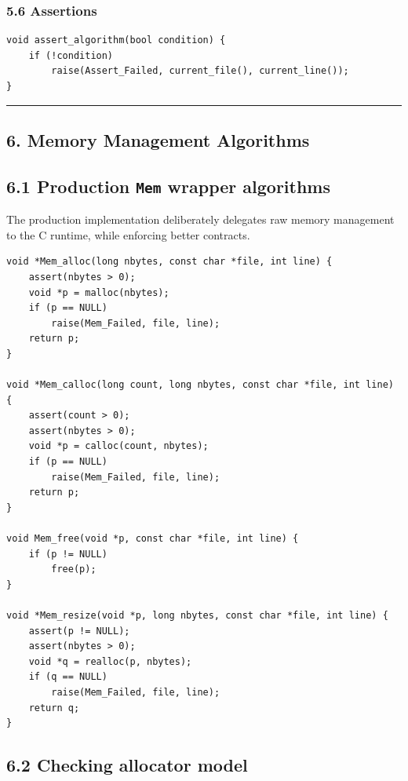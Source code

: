 \documentclass[11pt]{article}
\begin{document}
\subsubsection{5.6 Assertions}\label{assertions}

\begin{verbatim}
void assert_algorithm(bool condition) {
    if (!condition)
        raise(Assert_Failed, current_file(), current_line());
}
\end{verbatim}

\begin{center}\rule{0.5\linewidth}{0.5pt}\end{center}

\subsection{6. Memory Management Algorithms}\label{memory-management-algorithms}

\subsection{\texorpdfstring{6.1 Production \texttt{Mem} wrapper algorithms}{6.1 Production Mem wrapper algorithms}}\label{production-mem-wrapper-algorithms}

The production implementation deliberately delegates raw memory management to the C runtime, while enforcing better contracts.

\begin{verbatim}
void *Mem_alloc(long nbytes, const char *file, int line) {
    assert(nbytes > 0);
    void *p = malloc(nbytes);
    if (p == NULL)
        raise(Mem_Failed, file, line);
    return p;
}

void *Mem_calloc(long count, long nbytes, const char *file, int line) {
    assert(count > 0);
    assert(nbytes > 0);
    void *p = calloc(count, nbytes);
    if (p == NULL)
        raise(Mem_Failed, file, line);
    return p;
}

void Mem_free(void *p, const char *file, int line) {
    if (p != NULL)
        free(p);
}

void *Mem_resize(void *p, long nbytes, const char *file, int line) {
    assert(p != NULL);
    assert(nbytes > 0);
    void *q = realloc(p, nbytes);
    if (q == NULL)
        raise(Mem_Failed, file, line);
    return q;
}
\end{verbatim}

\subsection{6.2 Checking allocator model}\label{checking-allocator-model}
\end{document}
